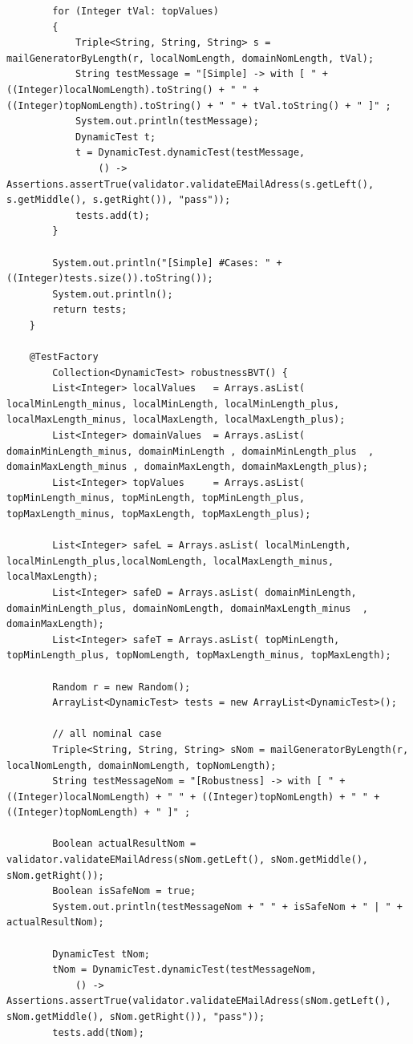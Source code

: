 \documentclass[a4paper,9pt,oneside]{scrreprt}
\begin{document}
\begin{lstlisting}
		for (Integer tVal: topValues) 
		{
			Triple<String, String, String> s = mailGeneratorByLength(r, localNomLength, domainNomLength, tVal);
			String testMessage = "[Simple] -> with [ " + ((Integer)localNomLength).toString() + " " + ((Integer)topNomLength).toString() + " " + tVal.toString() + " ]" ;
			System.out.println(testMessage);
			DynamicTest t;
			t = DynamicTest.dynamicTest(testMessage,
				() -> Assertions.assertTrue(validator.validateEMailAdress(s.getLeft(), s.getMiddle(), s.getRight()), "pass"));
			tests.add(t);
		}
	
		System.out.println("[Simple] #Cases: " + ((Integer)tests.size()).toString());
		System.out.println();
		return tests;
	}
	
	@TestFactory
		Collection<DynamicTest> robustnessBVT() {
		List<Integer> localValues	= Arrays.asList( localMinLength_minus, localMinLength, localMinLength_plus, localMaxLength_minus, localMaxLength, localMaxLength_plus);
		List<Integer> domainValues	= Arrays.asList( domainMinLength_minus, domainMinLength	, domainMinLength_plus	, domainMaxLength_minus	, domainMaxLength, domainMaxLength_plus);
		List<Integer> topValues		= Arrays.asList( topMinLength_minus, topMinLength, topMinLength_plus, topMaxLength_minus, topMaxLength, topMaxLength_plus);
		
		List<Integer> safeL	= Arrays.asList( localMinLength, localMinLength_plus,localNomLength, localMaxLength_minus, localMaxLength);
		List<Integer> safeD	= Arrays.asList( domainMinLength, domainMinLength_plus, domainNomLength, domainMaxLength_minus	, domainMaxLength);
		List<Integer> safeT	= Arrays.asList( topMinLength, topMinLength_plus, topNomLength, topMaxLength_minus, topMaxLength);
	
		Random r = new Random();
		ArrayList<DynamicTest> tests = new ArrayList<DynamicTest>();
	
		// all nominal case
		Triple<String, String, String> sNom = mailGeneratorByLength(r, localNomLength, domainNomLength, topNomLength);
		String testMessageNom = "[Robustness] -> with [ " + ((Integer)localNomLength) + " " + ((Integer)topNomLength) + " " +  ((Integer)topNomLength) + " ]" ;
		
		Boolean actualResultNom = validator.validateEMailAdress(sNom.getLeft(), sNom.getMiddle(), sNom.getRight());
		Boolean isSafeNom = true;
		System.out.println(testMessageNom + " " + isSafeNom + " | " + actualResultNom);
		
		DynamicTest tNom;
		tNom = DynamicTest.dynamicTest(testMessageNom,
			() -> Assertions.assertTrue(validator.validateEMailAdress(sNom.getLeft(), sNom.getMiddle(), sNom.getRight()), "pass"));
		tests.add(tNom);
	

\end{lstlisting}
\end{document}
